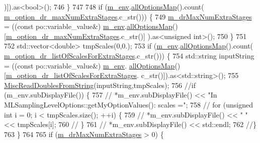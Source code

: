 \begin{DoxyCode}
{{{{{      )]).as<bool>();
746   \}
747 
748   \textcolor{keywordflow}{if} (\hyperlink{class_q_u_e_s_o_1_1_m_l_sampling_level_options_a5bdc1fb3f6eb46f73feec9c356c9a1b8}{m\_env}.\hyperlink{class_q_u_e_s_o_1_1_base_environment_ae7cee155956e0e70112f45e2ad1f02c8}{allOptionsMap}().count(
      \hyperlink{class_q_u_e_s_o_1_1_m_l_sampling_level_options_a20e22ade885c548888ba633bc71b5ab2}{m\_option\_dr\_maxNumExtraStages}.c\_str())) \{
749     \hyperlink{class_q_u_e_s_o_1_1_m_l_sampling_level_options_ab854494640bb98cad74ee656e62daab3}{m\_drMaxNumExtraStages} = ((\textcolor{keyword}{const} po::variable\_value&) 
      \hyperlink{class_q_u_e_s_o_1_1_m_l_sampling_level_options_a5bdc1fb3f6eb46f73feec9c356c9a1b8}{m\_env}.\hyperlink{class_q_u_e_s_o_1_1_base_environment_ae7cee155956e0e70112f45e2ad1f02c8}{allOptionsMap}()[\hyperlink{class_q_u_e_s_o_1_1_m_l_sampling_level_options_a20e22ade885c548888ba633bc71b5ab2}{m\_option\_dr\_maxNumExtraStages}.c\_str()]
      ).as<unsigned int>();
750   \}
751 
752   std::vector<double> tmpScales(0,0.);
753   \textcolor{keywordflow}{if} (\hyperlink{class_q_u_e_s_o_1_1_m_l_sampling_level_options_a5bdc1fb3f6eb46f73feec9c356c9a1b8}{m\_env}.\hyperlink{class_q_u_e_s_o_1_1_base_environment_ae7cee155956e0e70112f45e2ad1f02c8}{allOptionsMap}().count(
      \hyperlink{class_q_u_e_s_o_1_1_m_l_sampling_level_options_ad30c647128dde606b837cbf6c4c32389}{m\_option\_dr\_listOfScalesForExtraStages}.c\_str())) \{
754     std::string inputString = ((\textcolor{keyword}{const} po::variable\_value&) \hyperlink{class_q_u_e_s_o_1_1_m_l_sampling_level_options_a5bdc1fb3f6eb46f73feec9c356c9a1b8}{m\_env}.
      \hyperlink{class_q_u_e_s_o_1_1_base_environment_ae7cee155956e0e70112f45e2ad1f02c8}{allOptionsMap}()[\hyperlink{class_q_u_e_s_o_1_1_m_l_sampling_level_options_ad30c647128dde606b837cbf6c4c32389}{m\_option\_dr\_listOfScalesForExtraStages}.
      c\_str()]).as<std::string>();
755     \hyperlink{namespace_q_u_e_s_o_ac3fab438679d1dc864f8d629881dad2e}{MiscReadDoublesFromString}(inputString,tmpScales);
756     \textcolor{comment}{//if (m\_env.subDisplayFile()) \{}
757     \textcolor{comment}{//  *m\_env.subDisplayFile() << "In MLSamplingLevelOptions::getMyOptionValues(): scales =";}
758     \textcolor{comment}{//  for (unsigned int i = 0; i < tmpScales.size(); ++i) \{}
759     \textcolor{comment}{//    *m\_env.subDisplayFile() << " " << tmpScales[i];}
760     \textcolor{comment}{//  \}}
761     \textcolor{comment}{//  *m\_env.subDisplayFile() << std::endl;}
762     \textcolor{comment}{//\}}
763   \}
764 
765   \textcolor{keywordflow}{if} (\hyperlink{class_q_u_e_s_o_1_1_m_l_sampling_level_options_ab854494640bb98cad74ee656e62daab3}{m\_drMaxNumExtraStages} > 0) \{
}}}}}
\end{DoxyCode}
